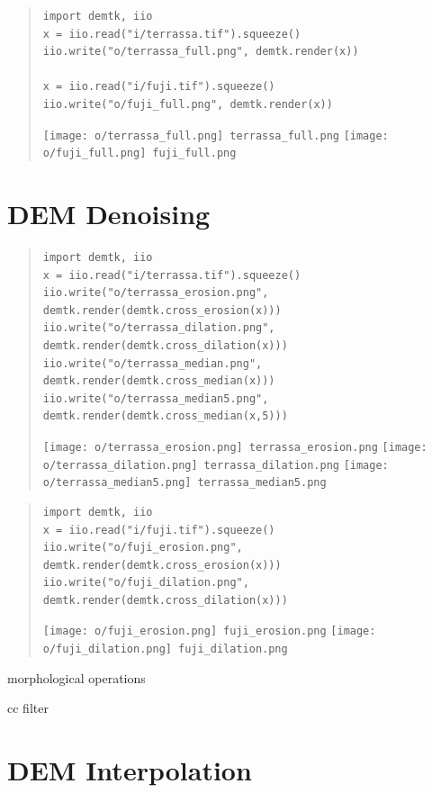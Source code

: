 \begin{quote}
\begin{verbatim}
import demtk, iio
x = iio.read("i/terrassa.tif").squeeze()
iio.write("o/terrassa_full.png", demtk.render(x))

x = iio.read("i/fuji.tif").squeeze()
iio.write("o/fuji_full.png", demtk.render(x))
\end{verbatim}
\texttt{[image: o/terrassa\_full.png]}~\verb+terrassa_full.png+
\texttt{[image: o/fuji\_full.png]}~\verb+fuji_full.png+
\end{quote}



\section{DEM Denoising}

\begin{quote}
\begin{verbatim}
import demtk, iio
x = iio.read("i/terrassa.tif").squeeze()
iio.write("o/terrassa_erosion.png",  demtk.render(demtk.cross_erosion(x)))
iio.write("o/terrassa_dilation.png", demtk.render(demtk.cross_dilation(x)))
iio.write("o/terrassa_median.png", demtk.render(demtk.cross_median(x)))
iio.write("o/terrassa_median5.png", demtk.render(demtk.cross_median(x,5)))
\end{verbatim}
\texttt{[image: o/terrassa\_erosion.png]}~\verb+terrassa_erosion.png+
\texttt{[image: o/terrassa\_dilation.png]}~\verb+terrassa_dilation.png+
\texttt{[image: o/terrassa\_median5.png]}~\verb+terrassa_median5.png+
\end{quote}

\begin{quote}
\begin{verbatim}
import demtk, iio
x = iio.read("i/fuji.tif").squeeze()
iio.write("o/fuji_erosion.png",  demtk.render(demtk.cross_erosion(x)))
iio.write("o/fuji_dilation.png", demtk.render(demtk.cross_dilation(x)))
\end{verbatim}
\texttt{[image: o/fuji\_erosion.png]}~\verb+fuji_erosion.png+
\texttt{[image: o/fuji\_dilation.png]}~\verb+fuji_dilation.png+
\end{quote}

morphological operations

cc filter


\section{DEM Interpolation}


